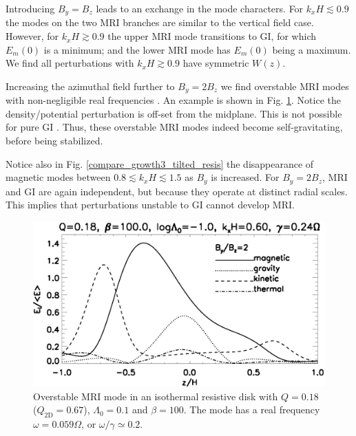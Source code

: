 Introducing $B_y = B_z$ leads to an exchange in the mode
characters. For $k_xH\lesssim 0.9$ the modes on the two MRI branches
are similar to the vertical field case. However, for $k_xH\gtrsim0.9$ 
the upper MRI mode transitions to GI, for which $E_m(0)$ is a
minimum; and the lower MRI mode has $E_m(0)$ being a maximum. We find
all perturbations with  $k_xH\gtrsim0.9$ have symmetric $W(z)$. 


Increasing the azimuthal field further to $B_y=2B_z$ we find
overstable MRI modes  with non-negligible real
frequencies \citep{gammie96}. An example is shown in
Fig. \ref{result_tilted_overstable}. Notice the density/potential
perturbation is off-set from the midplane. This is not possible for
pure GI \citep{goldreich65a}. Thus, these overstable MRI modes indeed
become self-gravitating, before being stabilized. 

Notice also in Fig. \ref{compare_growth3_tilted_resis} the disappearance of
magnetic modes between $0.8\lesssim k_xH\lesssim 1.5$ as $B_y$ is
increased. For $B_y=2B_z$, MRI and GI are again independent, but
because they operate at distinct radial scales. This implies that
perturbations unstable to GI cannot develop MRI.       


\begin{figure}
  \includegraphics[width=\linewidth,clip=true,trim=0cm 0cm 0cm
    0cm]{figures/result_tilted_resis.ps}
  \caption{Overstable MRI mode in an isothermal resistive disk with
    $Q=0.18$ ($Q_\mathrm{2D} = 0.67$), $\Lambda_0=0.1$ and $\beta=100$. 
    The mode has a real frequency $\omega = 0.059\Omega$, or
    $\omega/\gamma \simeq 0.2 $.   
    \label{result_tilted_overstable}}
\end{figure}
